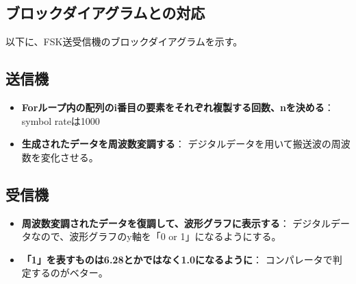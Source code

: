 \documentclass[a4paper, twocolumn]{article} %
\begin{document}
\subsection*{ブロックダイアグラムとの対応}
以下に、FSK送受信機のブロックダイアグラムを示す。

\subsection*{送信機}
\begin{itemize}
    \item \textbf{Forループ内の配列のi番目の要素をそれぞれ複製する回数、nを決める}：
    symbol rateは1000
    \item \textbf{生成されたデータを周波数変調する}：
    デジタルデータを用いて搬送波の周波数を変化させる。
\end{itemize}

\subsection*{受信機}
\begin{itemize}
    \item \textbf{周波数変調されたデータを復調して、波形グラフに表示する}：
    デジタルデータなので、波形グラフのy軸を「0 or 1」になるようにする。
    \item \textbf{「1」を表すものは6.28とかではなく1.0になるように}：
    コンパレータで判定するのがベター。
\end{itemize}
\end{document}
